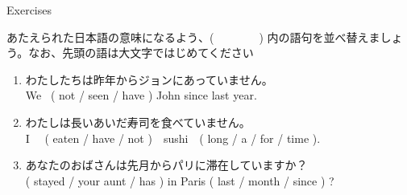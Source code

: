 \documentclass[aspectratio=169,xcolor={dvipsnames,table}]{beamer}
\newcommand{\myaudio}[1]{\href{#1}{\faVolumeUp}}
\begin{document}
\begin{frame}[plain]{Exercises}
 
あたえられた日本語の意味になるよう、(~~~~~~~~) 内の語句を並べ替えましょう。なお、先頭の語は大文字ではじめてください\mbox{}\hfill{\scriptsize \myaudio{./audio/012_have_pp_keizoku_09.mp3}}


\begin{enumerate}
 \item {\small わたしたちは昨年からジョンにあっていません。}\\
We  ~( not / seen / have ) John since last year.\\
 \item  {\small わたしは長いあいだ寿司を食べていません。}\\
I ~~( eaten /  have / not )~~sushi~~( long / a / for / time ).\\
 \item  {\small あなたのおばさんは先月からパリに滞在していますか}？\bcdfrance\\
( stayed /  your aunt / has ) in Paris ( last / month / since ) ? \\
\end{enumerate}
\end{frame}
\end{document}
